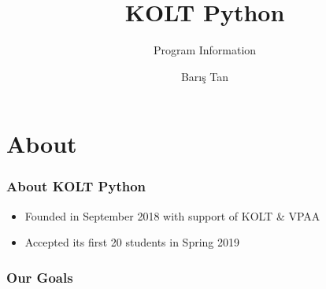 

\usepackage{../KU-Beamer-Template/style/koc} 

\title{KOLT Python} 
\subtitle{Program Information} 
\date{}
\author{Barış Tan}




  \maketitle


  \section{About}

    \begin{frame}
      \frametitle{About KOLT Python}
      
      \Large
      \begin{itemize}
        \item Founded in September 2018 with support of KOLT \& VPAA
        \item Accepted its first 20 students in Spring 2019
      \end{itemize}

      
    
    \end{frame}


    \begin{frame}
      \frametitle{Our Goals}
    
      
    
    \end{frame}


